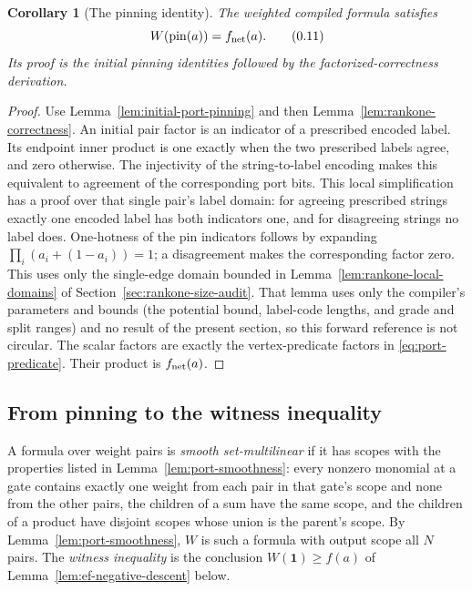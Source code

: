 \documentclass[11pt]{article}
\newtheorem{corollary}[theorem]{Corollary}
\theoremstyle{definition}
\theoremstyle{remark}
\begin{document}
\begin{corollary}[The pinning identity]
\label{cor:port-pinning-identity}
The weighted compiled formula satisfies
\[
 W(\operatorname{pin}(a))=f_{\rm net}(a).
 \tag{\thesection.11}\label{eq:compiled-pinning}
\]
Its proof is the initial pinning identities followed by the
factorized-correctness derivation.
\end{corollary}
\begin{proof}
Use Lemma~\ref{lem:initial-port-pinning} and then
Lemma~\ref{lem:rankone-correctness}. An initial pair factor is an
indicator of a prescribed encoded label. Its endpoint inner product
is one exactly when the two prescribed labels agree, and zero
otherwise. The injectivity of the string-to-label encoding makes this
equivalent to agreement of the corresponding port bits. This local
simplification has a proof over that single pair's label domain:
for agreeing prescribed strings exactly one encoded label has both
indicators one, and for disagreeing strings no label does. One-hotness
of the pin indicators follows by expanding
$\prod_i(a_i+(1-a_i))=1$; a disagreement makes the corresponding
factor zero. This uses only the single-edge domain bounded in
Lemma~\ref{lem:rankone-local-domains} of
Section~\ref{sec:rankone-size-audit}. That lemma uses only the
compiler's parameters and bounds (the potential bound, label-code
lengths, and grade and split ranges) and no result of the present
section, so this forward reference is not circular.
The scalar factors are exactly the vertex-predicate factors in
\eqref{eq:port-predicate}. Their product is $f_{\rm net}(a)$.
\end{proof}

\subsection{From pinning to the witness inequality}

A formula over weight pairs is \emph{smooth set-multilinear} if it has
scopes with the properties listed in Lemma~\ref{lem:port-smoothness}:
every nonzero monomial at a gate contains exactly one weight from each
pair in that gate's scope and none from the other pairs, the children
of a sum have the same scope, and the children of a product have
disjoint scopes whose union is the parent's scope. By
Lemma~\ref{lem:port-smoothness}, $W$ is such a formula with output
scope all $N$ pairs. The \emph{witness inequality} is the conclusion
$W(\mathbf1)\ge f(a)$ of Lemma~\ref{lem:ef-negative-descent} below.
\end{document}
